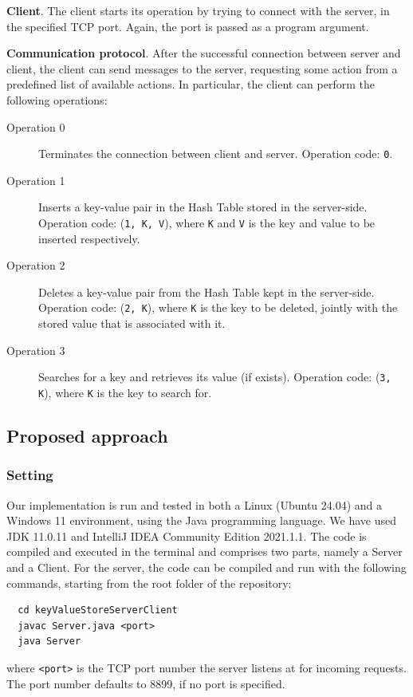 \documentclass[acmlarge]{acmart}
\begin{document}
\textbf{Client}. The client starts its operation by trying to connect with the server, in the specified TCP port. Again, the port is passed as a program argument.

\textbf{Communication protocol}. After the successful connection between server and client, the client can send messages to the server, requesting some action from a predefined list of available actions. In particular, the client can perform the following operations:
\begin{description}
  \item[Operation 0] Terminates the connection between client and server. Operation code: \texttt{0}.
  \item[Operation 1] Inserts a key-value pair in the Hash Table stored in the server-side. Operation code: (\texttt{1, K, V}), where \texttt{K} and \texttt{V} is the key and value to be inserted respectively.
  \item[Operation 2] Deletes a key-value pair from the Hash Table kept in the server-side. Operation code: (\texttt{2, K}), where \texttt{K} is the key to be deleted, jointly with the stored value that is associated with it.
  \item[Operation 3] Searches for a key and retrieves its value (if exists). Operation code: (\texttt{3, K}), where \texttt{K} is the key to search for.
\end{description}

\subsection{Proposed approach}

\subsubsection{Setting}
Our implementation is run and tested in both a Linux (Ubuntu 24.04) and a Windows 11 environment, using the Java programming language. We have used JDK 11.0.11 and IntelliJ IDEA Community Edition 2021.1.1. The code is compiled and executed in the terminal and comprises two parts, namely a Server and a Client. For the server, the code can be compiled and run with the following commands, starting from the root folder of the repository:

\begin{verbatim}
  cd keyValueStoreServerClient
  javac Server.java <port>
  java Server
\end{verbatim}
where \texttt{<port>} is the TCP port number the server listens at for incoming requests. The port number defaults to 8899, if no port is specified.
\end{document}
